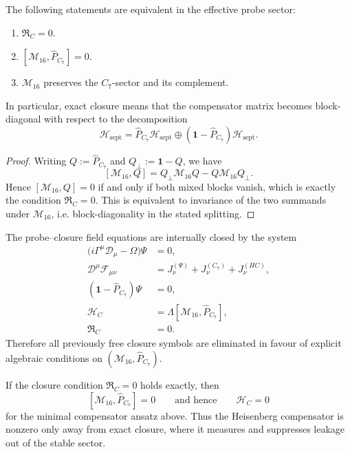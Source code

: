 \begin{proposition}
\label{prop:equivalent-closure-criteria}
The following statements are equivalent in the effective probe sector:
\begin{enumerate}
 \item $\mathfrak R_C=0$.
 \item $[\mathcal M_{16},\hat P_{C_7}]=0$.
 \item $\mathcal M_{16}$ preserves the $C_7$-sector and its complement.
\end{enumerate}
In particular, exact closure means that the compensator matrix becomes
block-diagonal with respect to the decomposition
\[
 \mathcal H_{\mathrm{sept}}
 = \hat P_{C_7}\mathcal H_{\mathrm{sept}}
 \oplus
 (\mathbf 1-\hat P_{C_7})\mathcal H_{\mathrm{sept}}.
\]
\end{proposition}

\begin{proof}
Writing $Q:=\hat P_{C_7}$ and $Q_\perp:=\mathbf 1-Q$, we have
\[
 [\mathcal M_{16},Q]
 =
 Q_\perp\mathcal M_{16}Q - Q\mathcal M_{16}Q_\perp.
\]
Hence $[\mathcal M_{16},Q]=0$ if and only if both mixed blocks vanish,
which is exactly the condition $\mathfrak R_C=0$.
This is equivalent to invariance of the two summands under
$\mathcal M_{16}$, i.e. block-diagonality in the stated splitting.
\end{proof}

\begin{theorem}
\label{thm:closed-master-system}
The probe--closure field equations are internally closed by the system
\begin{align*}
 \bigl(i\Gamma^\mu\mathcal D_\mu - \Omega\bigr)\Psi &= 0,\\
 \mathcal D^\mu\mathcal F_{\mu\nu}
 &= J^{(\Psi)}_\nu + J^{(C_7)}_\nu + J^{(HC)}_\nu,\\
 (\mathbf 1-\hat P_{C_7})\Psi &= 0,\\
 \mathcal H_C &= \Lambda[\mathcal M_{16},\hat P_{C_7}],\\
 \mathfrak R_C &= 0.
\end{align*}
Therefore all previously free closure symbols are eliminated in favour
of explicit algebraic conditions on $(\mathcal M_{16},\hat P_{C_7})$.
\end{theorem}

\begin{corollary}
If the closure condition $\mathfrak R_C=0$ holds exactly, then
\[
 [\mathcal M_{16},\hat P_{C_7}] = 0
 \qquad\text{and hence}\qquad
 \mathcal H_C = 0
\]
for the minimal compensator ansatz above.
Thus the Heisenberg compensator is nonzero only away from exact closure,
where it measures and suppresses leakage out of the stable sector.
\end{corollary}

